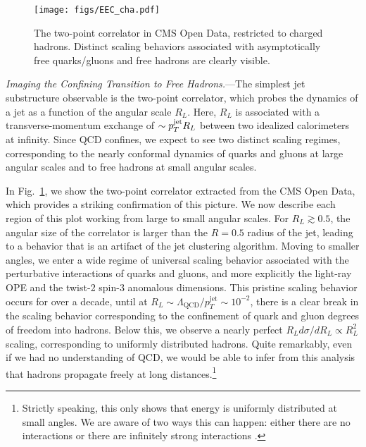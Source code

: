 \documentclass[aps,prl,twocolumn,showpacs,10pt,superscriptaddress,preprintnumbers,nofootinbib,longbibliography]{revtex4-1}
\DeclareRobustCommand{\Fig}[1]{Fig.~\ref{#1}}
\begin{document}
\begin{figure}[t]
%
\texttt{[image: figs/EEC\_cha.pdf]}
%
\caption{The two-point correlator in CMS Open Data, restricted to charged hadrons.
%
Distinct scaling behaviors associated with asymptotically free quarks/gluons and free hadrons are clearly visible. }
%
\label{fig:EEC}
%
\end{figure}


\emph{Imaging the Confining Transition to Free Hadrons.}---The simplest jet substructure observable is the two-point correlator, which probes the dynamics of a jet as a function of the angular scale $R_L$.
%
Here, $R_L$ is associated with a transverse-momentum exchange of $\sim p_T^{\rm jet} R_L$ between two idealized calorimeters at infinity.
%
Since QCD confines, we expect to see two distinct scaling regimes, corresponding to the nearly conformal dynamics of quarks and gluons at large angular scales and to free hadrons at small angular scales. 

In \Fig{fig:EEC}, we show the two-point correlator extracted from the CMS Open Data, which provides a striking confirmation of this picture.
%
We now describe each region of this plot working from large to small angular scales.
%
For $R_L \gtrsim 0.5$, the angular size of the correlator is larger than the $R=0.5$ radius of the jet, leading to a behavior that is an artifact of the jet clustering algorithm. 
%
Moving to smaller angles, we enter a wide regime of universal scaling behavior associated with the perturbative interactions of quarks and gluons, and more explicitly the light-ray OPE and the twist-2 spin-3 anomalous dimensions.
%
This pristine scaling behavior occurs for over a decade, until at $R_L \sim \Lambda_{\text{QCD}}/p_T^{\text{jet}}\sim 10^{-2}$, there is a clear break in the scaling behavior corresponding to the confinement of quark and gluon degrees of freedom into hadrons.
%
Below this, we observe a nearly perfect $R_L d\sigma/d R_L \propto  R_L^2$ scaling, corresponding to uniformly distributed hadrons.
%
Quite remarkably, even if we had no understanding of QCD, we would be able to infer from this analysis that hadrons propagate freely at long distances.\footnote{Strictly speaking, this only shows that energy is uniformly distributed at small angles. We are aware of two ways this can happen:  either there are no interactions or there are infinitely strong interactions \cite{Strassler:2008bv,Hofman:2008ar,Hatta:2008tx}.}
\end{document}
